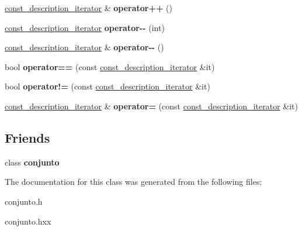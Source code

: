 \begin{DoxyCompactItemize}
\item 
\hypertarget{classconjunto_1_1const__description__iterator_a01fbd7ba089e91377a9945818a75cc2b}{\hyperlink{classconjunto_1_1const__description__iterator}{const\-\_\-description\-\_\-iterator} \& {\bfseries operator++} ()}\label{classconjunto_1_1const__description__iterator_a01fbd7ba089e91377a9945818a75cc2b}

\item 
\hypertarget{classconjunto_1_1const__description__iterator_a00864c18a313f9a651d9ba22fa3b44ca}{\hyperlink{classconjunto_1_1const__description__iterator}{const\-\_\-description\-\_\-iterator} {\bfseries operator-\/-\/} (int)}\label{classconjunto_1_1const__description__iterator_a00864c18a313f9a651d9ba22fa3b44ca}

\item 
\hypertarget{classconjunto_1_1const__description__iterator_acec2d24c261a519f33d062d382c3d6f8}{\hyperlink{classconjunto_1_1const__description__iterator}{const\-\_\-description\-\_\-iterator} \& {\bfseries operator-\/-\/} ()}\label{classconjunto_1_1const__description__iterator_acec2d24c261a519f33d062d382c3d6f8}

\item 
\hypertarget{classconjunto_1_1const__description__iterator_a10b1ae1aef96a8c424ca65578c18993f}{bool {\bfseries operator==} (const \hyperlink{classconjunto_1_1const__description__iterator}{const\-\_\-description\-\_\-iterator} \&it)}\label{classconjunto_1_1const__description__iterator_a10b1ae1aef96a8c424ca65578c18993f}

\item 
\hypertarget{classconjunto_1_1const__description__iterator_ab6edb507aa74528f97a579df5ebb210f}{bool {\bfseries operator!=} (const \hyperlink{classconjunto_1_1const__description__iterator}{const\-\_\-description\-\_\-iterator} \&it)}\label{classconjunto_1_1const__description__iterator_ab6edb507aa74528f97a579df5ebb210f}

\item 
\hypertarget{classconjunto_1_1const__description__iterator_a5311087213c62737855ac80c384cf092}{\hyperlink{classconjunto_1_1const__description__iterator}{const\-\_\-description\-\_\-iterator} \& {\bfseries operator=} (const \hyperlink{classconjunto_1_1const__description__iterator}{const\-\_\-description\-\_\-iterator} \&it)}\label{classconjunto_1_1const__description__iterator_a5311087213c62737855ac80c384cf092}

\end{DoxyCompactItemize}
\subsection*{Friends}
\begin{DoxyCompactItemize}
\item 
\hypertarget{classconjunto_1_1const__description__iterator_a42fdcda39c77eabd7380e29fcdbe5dd2}{class {\bfseries conjunto}}\label{classconjunto_1_1const__description__iterator_a42fdcda39c77eabd7380e29fcdbe5dd2}

\end{DoxyCompactItemize}


The documentation for this class was generated from the following files\-:\begin{DoxyCompactItemize}
\item 
conjunto.\-h\item 
conjunto.\-hxx\end{DoxyCompactItemize}
